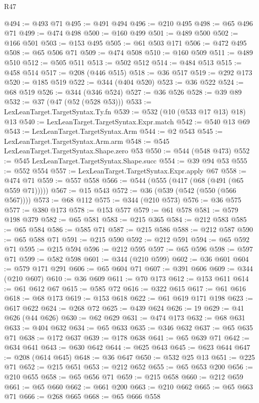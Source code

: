 \begin{lexlean}{R47}
\begin{coremodule}
@494 := @493 @71
@495 := @491 @494
@496 := @210 @495
@498 := @65 @496 @71
@499 := @474 @498
@500 := @160 @499
@501 := @489 @500
@502 := @166 @501
@503 := @153 @495
@505 := @61 @503 @171
@506 := @472 @495
@508 := @65 @506 @71
@509 := @474 @508
@510 := @160 @509
@511 := @489 @510
@512 := @505 @511
@513 := @502 @512
@514 := @484 @513
@515 := @458 @514
@517 := @208 (@446 @515)
@518 := @36 @517
@519 := @292 @173
@520 := @185 @519
@522 := @344 (@404 @520)
@523 := @36 @522
@524 := @68 @519
@526 := @344 (@346 @524)
@527 := @36 @526
@528 := @39 @89
@532 := @37 (@47 (@52 (@528 @53)))
@533 := LexLeanTarget.TargetSyntax.Ty.fn
@539 := @532 (@10 (@533 @17 @13) @18) @13
@540 := LexLeanTarget.TargetSyntax.Expr.match
@542 := @540 @13 @69
@543 := LexLeanTarget.TargetSyntax.Arm
@544 := @2 @543
@545 := LexLeanTarget.TargetSyntax.Arm.arm
@548 := @545 LexLeanTarget.TargetSyntax.Shape.zero @53
@550 := @544 (@548 @473)
@552 := @545 LexLeanTarget.TargetSyntax.Shape.succ
@554 := @39 @94 @53
@555 := @552 @554
@557 := LexLeanTarget.TargetSyntax.Expr.apply @67
@558 := @474 @71
@559 := @557 @558
@566 := @544 (@555 (@417 (@68 (@491 (@65 @559 @71)))))
@567 := @15 @543
@572 := @36 (@539 (@542 (@550 (@566 @567))))
@573 := @68 @112
@575 := @344 (@210 @573)
@576 := @36 @575
@577 := @380 @173
@578 := @153 @577
@579 := @61 @578
@581 := @579 @198 @379
@582 := @65 @581
@583 := @215 @365
@584 := @212 @583
@585 := @65 @584
@586 := @585 @71
@587 := @215 @586
@588 := @212 @587
@590 := @65 @588 @71
@591 := @215 @590
@592 := @212 @591
@594 := @65 @592 @71
@595 := @215 @594
@596 := @212 @595
@597 := @65 @596
@598 := @597 @71
@599 := @582 @598
@601 := @344 (@210 @599)
@602 := @36 @601
@604 := @579 @171 @291
@606 := @65 @604 @71
@607 := @391 @606
@609 := @344 (@210 @607)
@610 := @36 @609
@611 := @70 @173
@612 := @153 @611
@614 := @61 @612 @67
@615 := @585 @72
@616 := @322 @615
@617 := @61 @616
@618 := @68 @173
@619 := @153 @618
@622 := @61 @619 @171 @198
@623 := @617 @622
@624 := @268 @72
@625 := @439 @624
@626 := 19
@629 := @41 @626 (@44 @626)
@630 := @62 @629
@631 := @474 @173
@632 := @68 @631
@633 := @404 @632
@634 := @65 @633
@635 := @346 @632
@637 := @65 @635 @71
@638 := @172 @637
@639 := @178 @638
@641 := @65 @639 @71
@642 := @634 @641
@643 := @630 @642
@644 := @625 @643
@645 := @623 @644
@647 := @208 (@614 @645)
@648 := @36 @647
@650 := @532 @25 @13
@651 := @225 @71
@652 := @215 @651
@653 := @212 @652
@655 := @65 @653 @200
@656 := @210 @655
@658 := @65 @656 @71
@659 := @215 @658
@660 := @212 @659
@661 := @65 @660
@662 := @661 @200
@663 := @210 @662
@665 := @65 @663 @71
@666 := @268 @665
@668 := @65 @666 @558

\end{coremodule}
\end{lexlean}
